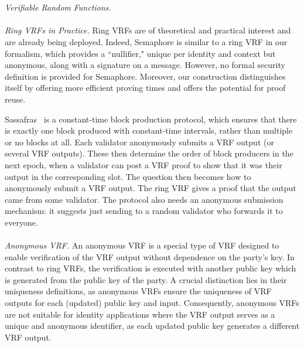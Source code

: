 \\\\
\noindent\textit{Verifiable Random Functions.} 
\\\\
\noindent\textit{Ring VRFs in Practice.} 
Ring VRFs are of theoretical and practical interest and are already being deployed.
Indeed, Semaphore \cite{Semaphore} is similar to a ring VRF in our formalism, which provides a ``nullifier," unique per identity and context but anonymous, along with a signature on a message. However, no formal security definition is provided for Semaphore.  Moreover, our construction distinguishes itself by offering more efficient proving times  and offers the potential for proof reuse.

Sassafras~\cite{Sassafras} is a constant-time block production protocol, which ensures that there is exactly one block produced with constant-time intervals, rather than multiple or no blocks at all.
Each validator anonymously submits a VRF output (or several VRF outputs). These then determine the order of block producers in the next epoch, when a validator can post a VRF proof to show that it was their output in the corresponding slot. The question then becomes how to anonymously submit a VRF output. The ring VRF gives a proof that the output came from some validator. The protocol also needs an anonymous submission mechanism: it suggests just sending to a random validator who forwards it to everyone.
\\\\
\noindent\textit{Anonymous VRF.}  An anonymous VRF \cite{anonymousVRF} is a special type of VRF designed to enable verification of the VRF output without dependence on the party's key.  In contrast to ring VRFs, the verification is executed with another public key which is generated from the public key of the party.  A crucial distinction lies in their  uniqueness definitions, as anonymous VRFs ensure the uniqueness of VRF outputs for each (updated) public key and input. Consequently, anonymous VRFs are not suitable for identity applications where the VRF output serves as a unique and anonymous identifier, as each updated public key generates a different VRF output.
